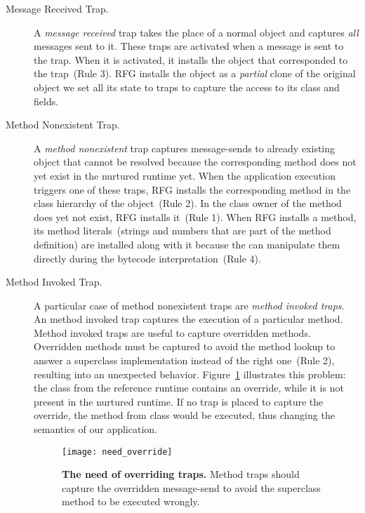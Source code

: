 \begin{description}
\item[Message Received Trap.] A \emph{message received} trap takes the place of a normal object and captures \emph{all} messages sent to it. These traps are activated when a message is sent to the trap. When it is activated, it installs the object that corresponded to the trap~(Rule 3). RFG installs the object as a \emph{partial} clone of the original object \ie we set all its state to traps to capture the access to its class and fields.%

\item[Method Nonexistent Trap.] A \emph{method nonexistent} trap captures message-sends to already existing object that cannot be resolved because the corresponding method does not yet exist in the nurtured runtime yet. When the application execution triggers one of these traps, RFG installs the corresponding method in the class hierarchy of the object~(Rule 2). In the class owner of the method does yet not exist, RFG installs it~(Rule 1). When RFG installs a method, its method literals~(\eg strings and numbers that are part of the method definition) are installed along with it because the \VM can manipulate them directly during the bytecode interpretation~(Rule 4).

\item[Method Invoked Trap.] A particular case of method nonexistent traps are \emph{method invoked traps}. An method invoked trap captures the execution of a particular method. Method invoked traps are useful to capture overridden methods. Overridden methods must be captured to avoid the method lookup to answer a superclass implementation instead of the right one~(Rule 2), resulting into an unexpected behavior. Figure~\ref{fig:need_override} illustrates this problem: the class  from the reference runtime contains an override, while it is not present in the nurtured runtime. If no trap is placed to capture the override, the method  from class  would be executed, thus changing the semantics of our application.

\begin{figure}[ht]
\begin{center}
\texttt{[image: need\_override]}
\caption{\textbf{The need of overriding traps.} Method traps should capture the overridden  message-send to avoid the superclass method to be executed wrongly.\label{fig:need_override}}
\end{center}
\end{figure}

\end{description}

